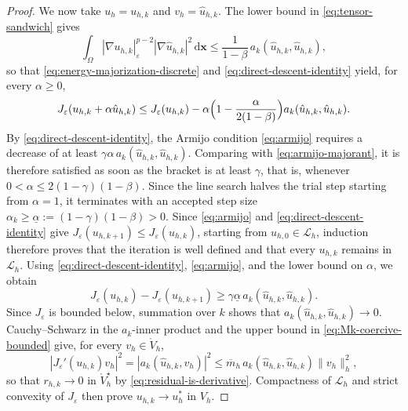 \documentclass[10pt,a4paper]{amsart}
\newcommand{\bs}[1]{\ensuremath{\boldsymbol{#1}}}
\begin{document}
\begin{proof}
We now take $u_h=u_{h,k}$ and $v_h=\hat u_{h,k}$. The lower bound in \eqref{eq:tensor-sandwich} gives
\begin{equation*}
  \int_\Omega|\nabla u_{h,k}|_\varepsilon^{p-2}|\nabla\hat u_{h,k}|^2\,\mathrm{d}\bs x
  \le\frac{1}{1-\beta}\,a_k(\hat u_{h,k},\hat u_{h,k}),
\end{equation*}
so that \eqref{eq:energy-majorization-discrete} and \eqref{eq:direct-descent-identity} yield, for every $\alpha\ge0$,
\begin{equation}\label{eq:armijo-majorant}
  J_\varepsilon(u_{h,k}+\alpha\hat u_{h,k})
  \le J_\varepsilon(u_{h,k})
  -\alpha\Bigl(1-\frac{\alpha}{2(1-\beta)}\Bigr)
   a_k(\hat u_{h,k},\hat u_{h,k}).
\end{equation}
By \eqref{eq:direct-descent-identity}, the Armijo condition \eqref{eq:armijo} requires a decrease of at least $\gamma\alpha\,a_k(\hat u_{h,k},\hat u_{h,k})$. Comparing with \eqref{eq:armijo-majorant}, it is therefore satisfied as soon as the bracket is at least $\gamma$, that is,
whenever $0<\alpha\le2(1-\gamma)(1-\beta)$. Since the line search halves the trial step
starting from $\alpha=1$, it terminates with an accepted step size
$\alpha_k\ge\underline\alpha:=(1-\gamma)(1-\beta)>0$.
Since \eqref{eq:armijo} and \eqref{eq:direct-descent-identity} give $J_\varepsilon(u_{h,k+1})\le J_\varepsilon(u_{h,k})$, starting from
$u_{h,0}\in\mathcal L_h$, induction therefore proves that the iteration is
well defined and that every $u_{h,k}$ remains in $\mathcal L_h$.
Using \eqref{eq:direct-descent-identity}, \eqref{eq:armijo}, and the lower bound on $\alpha$, we obtain
\begin{equation*}
  J_\varepsilon(u_{h,k})-J_\varepsilon(u_{h,k+1})
  \ge \gamma\underline\alpha\,
  a_k(\hat u_{h,k},\hat u_{h,k}).
\end{equation*}
Since $J_\varepsilon$ is bounded below, summation over $k$ shows that $a_k(\hat u_{h,k},\hat u_{h,k})\to 0$. Cauchy--Schwarz in the  $a_k$-inner product and the upper bound in
\eqref{eq:Mk-coercive-bounded} give, for every $v_h\in\mathring V_h$,
\begin{equation*}
  |J_\varepsilon'(u_{h,k})v_h|^2
  =|a_k(\hat u_{h,k},v_h)|^2
  \le \overline m_h\, a_k(\hat u_{h,k},\hat u_{h,k})\|v_h\|_h^2,
\end{equation*}
so that $r_{h,k}\to0$ in $\mathring V_h^\star$ by \eqref{eq:residual-is-derivative}. Compactness of $\mathcal L_h$ and strict convexity of $J_\varepsilon$ then prove $u_{h,k}\to u_h^*$ in $V_h$.
\end{proof}
\end{document}
